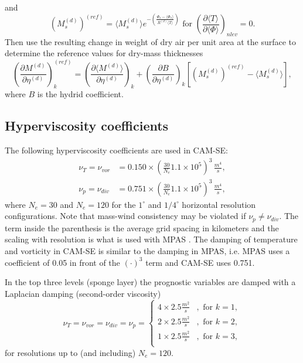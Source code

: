 \documentclass{agujournal}
\begin{document}
{\begin{equation}
\end{equation}
and
\begin{equation}
\left( M^{(d)}_s \right)^{(ref)}=\langle M^{(d)}_s \rangle e^{-\left( \frac{\Phi_s-\langle \Phi_s\rangle}{R^{(d)}\langle T \rangle}\right)}\text{ for }\left( \frac{\partial \langle T\rangle}{\partial \langle \Phi \rangle}\right)_{nlev}= 0.
\end{equation}
Then use the resulting change in weight of dry air per unit area at the surface to determine the reference values for dry-mass thicknesses
\begin{equation}
\left( \frac{\partial M^{(d)}}{\partial \eta^{(d)}}\right)^{(ref)}_k=\left( \frac{\partial \langle M^{(d)}\rangle}{\partial \eta^{(d)}}\right)_k+\left( \frac{\partial B}{\partial \eta^{(d)}}\right)_k\left[ \left( M^{(d)}_s \right)^{(ref)}-\langle M^{(d)}_s \rangle \right],
\end{equation}
where $B$ is the hydrid coefficient.
%
%
% 
\subsection{Hyperviscosity coefficients}\label{app:nu}
The following hyperviscosity coefficients are used in CAM-SE:
\begin{align}
\nu_T = \nu_{vor} &= 0.150\times \left(\frac{30}{N_e}1.1\times 10^5\right)^3\, \frac{m^4}{s},\\
\nu_p = \nu_{div} &= 0.751\times \left(\frac{30}{N_e}1.1\times 10^5\right)^3\, \frac{m^4}{s},
\end{align}
where $N_e=30$ and $N_e=120$ for the $1^\circ$ and $1/4^{\circ}$ horizontal resolution configurations. Note that mass-wind consistency may be violated if $\nu_p \neq \nu_{div}$. The term inside the parenthesis is the average grid spacing in kilometers and the scaling with resolution is what is used with MPAS \citep[Model for Prediction Across Scales; ][]{SPKS2014JAS}. The damping of temperature and vorticity in CAM-SE is similar to the damping in MPAS, i.e. MPAS uses a coefficient of 0.05 in front of the $(\cdot)^3$ term and CAM-SE uses 0.751.

In the top three levels (sponge layer) the prognostic variables are damped with a Laplacian damping (second-order viscosity)
\begin{equation}
\nu_T = \nu_{vor} = \nu_{div} = \nu_p = 
\begin{cases}
4\times 2.5 \frac{m^2}{s}&, \text{ for }k=1,\\
2\times 2.5 \frac{m^2}{s}&, \text{ for }k=2,\\
1\times 2.5 \frac{m^2}{s}&, \text{ for }k=3,\\
\end{cases}
\end{equation}
for resolutions up to (and including) $N_e=120$.
%
}
\end{document}
